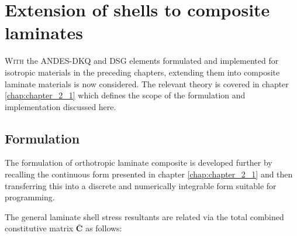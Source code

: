 



\chapter{Extension of shells to composite laminates}
\label{chap:chapter_composite_formulation_implementation}

\renewcommand{\Thema}{Extension of shells to composite laminates}

\lettrine[lines=2]{W}{ith} the ANDES-DKQ and DSG elements formulated and implemented for isotropic materials in the preceding chapters, extending them into composite laminate materials is now considered. The relevant theory is covered in chapter \ref{chap:chapter_2_1} which defines the scope of the formulation and implementation discussed here.

\section{Formulation}
The formulation of orthotropic laminate composite is developed further by recalling the continuous form presented in chapter \ref{chap:chapter_2_1} and then transferring this into a discrete and numerically integrable form suitable for programming.

The general laminate shell stress resultants are related via the total combined constitutive matrix $\bar{\mathbf{C}}$ as follows:

